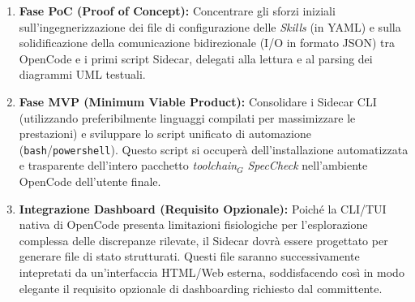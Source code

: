 \documentclass[a4paper, 11pt]{article}
\newcommand{\term}[1]{\textit{#1}$_G$}
\begin{document}
\begin{enumerate}[noitemsep]
    \item \textbf{Fase PoC (Proof of Concept):} Concentrare gli sforzi iniziali sull'ingegnerizzazione dei file di configurazione delle \textit{Skills} (in YAML) e sulla solidificazione della comunicazione bidirezionale (I/O in formato JSON) tra OpenCode e i primi script Sidecar, delegati alla lettura e al parsing dei diagrammi UML testuali.
    \item \textbf{Fase MVP (Minimum Viable Product):} Consolidare i Sidecar CLI (utilizzando preferibilmente linguaggi compilati per massimizzare le prestazioni) e sviluppare lo script unificato di automazione (\texttt{bash}/\texttt{powershell}). Questo script si occuperà dell'installazione automatizzata e trasparente dell'intero pacchetto \term{toolchain} \textit{SpecCheck} nell'ambiente OpenCode dell'utente finale.
    \item \textbf{Integrazione Dashboard (Requisito Opzionale):} Poiché la CLI/TUI nativa di OpenCode presenta limitazioni fisiologiche per l'esplorazione complessa delle discrepanze rilevate, il Sidecar dovrà essere progettato per generare file di stato strutturati. Questi file saranno successivamente intepretati da un'interfaccia HTML/Web esterna, soddisfacendo così in modo elegante il requisito opzionale di dashboarding richiesto dal committente.
\end{enumerate}
\end{document}
